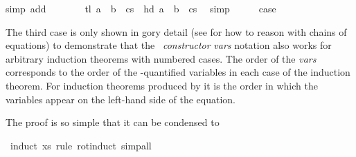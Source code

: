 \begin{isabellebody}
{}simp\ add{}{}{}\isanewline
\ \ \isamarkupfalse%
\ \isamarkupfalse%
\ {}{}\ {}\ tl\ {}a\ {}\ b\ {}\ cs{}\ {}\ {}hd\ {}a\ {}\ b\ {}\ cs{}{}{}\ \isamarkupfalse%
\ simp\isanewline
\ \ \isamarkupfalse%
\ \isamarkupfalse%
\ {}case\ \isamarkupfalse%
\isanewline
{}\isamarkupfalse%
%
\endisatagproof
{\isafoldproof}%
%
\isadelimproof
%
\endisadelimproof
%
\begin{isamarkuptext}%
\noindent
The third case is only shown in gory detail (see \cite{BauerW-TPHOLs01}
for how to reason with chains of equations) to demonstrate that the
~\isa{(}\emph{constructor} \emph{vars}\isa{)} notation also
works for arbitrary induction theorems with numbered cases. The order
of the \emph{vars} corresponds to the order of the
-quantified variables in each case of the induction
theorem. For induction theorems produced by  it is
the order in which the variables appear on the left-hand side of the
equation.

The proof is so simple that it can be condensed to%
\end{isamarkuptext}%
\isamarkuptrue%
%
\isadelimproof
%
\endisadelimproof
%
\isatagproof
{}\isamarkupfalse%
\ {}induct\ xs\ rule{}\ rot{}induct{}\ simp{}all\isanewline
%
\endisatagproof
{\isafoldproof}%
%
\isadelimproof
%
\endisadelimproof
%
\isadelimtheory
%
\endisadelimtheory
%
\isatagtheory
%
\endisatagtheory
{\isafoldtheory}%
%
\isadelimtheory
%
\endisadelimtheory
\end{isabellebody}%
